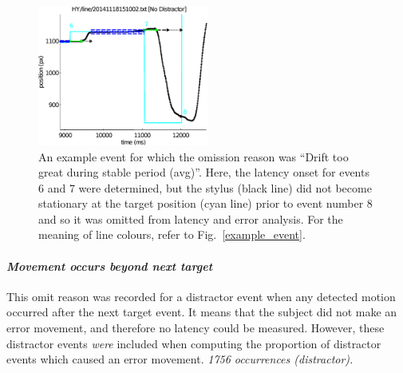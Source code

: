 \begin{figure}[htb!]
\centering
\includegraphics[width=0.5\textwidth]{./figures/drift_too_great_nolegend.eps}
\caption[Drift too great] {An example event for which the omission
  reason was ``Drift too great during stable period (avg)''. Here, the
  latency onset for events 6 and 7 were determined, but the stylus
  (black line) did not become stationary at the target position (cyan
  line) prior to event number 8 and so it was omitted from latency and
  error analysis. For the meaning of line colours, refer to
  Fig.~\ref{example_event}.}
\label{omission_reason_8}
\end{figure}




\paragraph{\emph{Movement occurs beyond next target}}
This omit reason was recorded for a distractor event when any detected
motion occurred after the next target event. It means that the subject
did not make an error movement, and therefore no latency could be
measured. However, these distractor events \emph{were} included when
computing the proportion of distractor events which caused an error
movement. \emph{1756 occurrences (distractor).}

